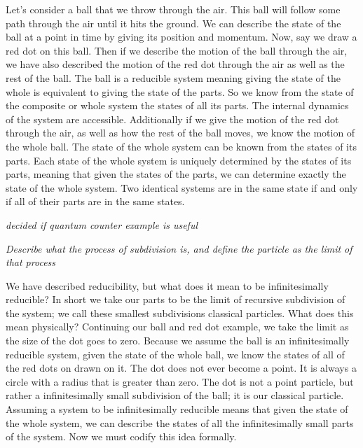 \documentclass{article}
\begin{document}
	Let's consider a ball that we throw through the air. This ball will follow some path through the air until it hits the ground. We can describe the state of the ball at a point in time by giving its position and momentum. Now, say we draw a red dot on this ball. Then if we describe the motion of the ball through the air, we have also described the motion of the red dot through the air as well as the rest of the ball. The ball is a reducible system meaning giving the state of the whole is equivalent to giving the state of the parts. So we know from the state of the composite or whole system the states of all its parts. The internal dynamics of the system are accessible. Additionally if we give the motion of the red dot through the air, as well as how the rest of the ball moves, we know the motion of the whole ball. The state of the whole system can be known from the states of its parts. Each state of the whole system is uniquely determined by the states of its parts, meaning that given the states of the parts, we can determine exactly the state of the whole system. Two identical systems are in the same state if and only if all of their parts are in the same states.
	
	\emph{decided if quantum counter example is useful}
	
	 
	 \emph{Describe what the process of subdivision is, and define the particle as the limit of that process}
	 
	 We have described reducibility, but what does it mean to be infinitesimally reducible? In short we take our parts to be the limit of recursive subdivision of the system; we call these smallest subdivisions classical particles. What does this mean physically? Continuing our ball and red dot example, we take the limit as the size of the dot goes to zero. Because we assume the ball is an infinitesimally reducible system, given the state of the whole ball, we know the states of all of the red dots on drawn on it. The dot does not ever become a point. It is always a circle with a radius that is greater than zero. The dot is not a point particle, but rather a infinitesimally small subdivision of the ball; it is our classical particle. Assuming a system to be infinitesimally reducible means that given the state of the whole system, we can describe the states of all the infinitesimally small parts of the system.  Now we must codify this idea formally.
	 
\end{document}
